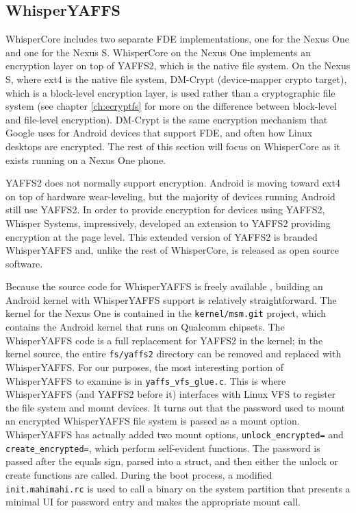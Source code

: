 \subsection{WhisperYAFFS}
WhisperCore includes two separate FDE implementations, one for the Nexus One and one for the Nexus S. WhisperCore on the Nexus
One implements an encryption layer on top of YAFFS2, which is the native file system.  On the Nexus S, where ext4 is the native
file system, DM-Crypt (device-mapper crypto target), which is a block-level encryption layer, is used rather than a cryptographic
file system (see chapter \ref{ch:ecryptfs} for more on the difference between block-level and file-level encryption).  DM-Crypt is the
same encryption mechanism that Google uses for Android devices that support FDE, and often how Linux desktops are encrypted.  The
rest of this section will focus on WhisperCore as it exists running on a Nexus One phone.

YAFFS2 does not normally support encryption.  Android is moving toward ext4 on top of hardware wear-leveling, but the majority of
devices running Android still use YAFFS2.  In order to provide encryption for devices using YAFFS2, Whisper Systems, impressively,
developed an extension to YAFFS2 providing encryption at the page level.  This extended version of YAFFS2 is branded WhisperYAFFS
and, unlike the rest of WhisperCore, is released as open source software.

Because the source code for WhisperYAFFS is freely available \cite{whisperyaffs}, building an Android kernel with WhisperYAFFS
support is relatively straightforward. The kernel for the Nexus One is contained in the \texttt{kernel/msm.git} project, which contains the
Android kernel that runs on Qualcomm chipsets.  The WhisperYAFFS code is a full replacement for YAFFS2 in the kernel; in the kernel
source, the entire \texttt{fs/yaffs2} directory can be removed and replaced with WhisperYAFFS.  For our purposes, the most
interesting portion of WhisperYAFFS to examine is in \texttt{yaffs\_vfs\_glue.c}.  This is where WhisperYAFFS (and YAFFS2 before it)
interfaces with Linux VFS to register the file system and mount devices.  It turns out that the password used to mount an encrypted
WhisperYAFFS file system is passed as a mount option.  WhisperYAFFS has actually added two mount options, \texttt{unlock\_encrypted=}
and \texttt{create\_encrypted=}, which perform self-evident functions.  The password is passed after the equals sign, parsed into a
struct, and then either the unlock or create functions are called.  During the boot process, a modified \texttt{init.mahimahi.rc} is
used to call a binary on the system partition that presents a minimal UI for password entry and makes the appropriate mount call. 

